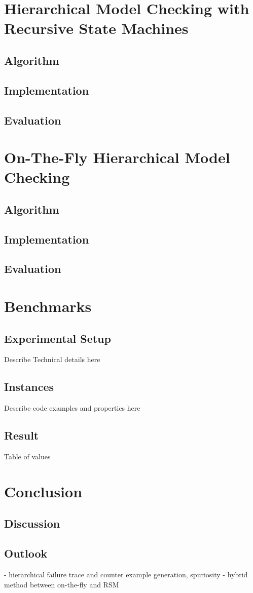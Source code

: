 \documentclass[a4paper, 12pt, twoside]{report}
\begin{document}
	\chapter{Hierarchical Model Checking with Recursive State Machines}\label{chp:hmc}

	\section{Algorithm}
	\section{Implementation}
	\section{Evaluation}
	
	
	\chapter{On-The-Fly Hierarchical Model Checking}\label{chp:otf}
	\section{Algorithm}
	\section{Implementation}
	\section{Evaluation}
	
	\chapter{Benchmarks}	
	\section{Experimental Setup}
	Describe Technical details here
	\section{Instances}
	Describe code examples and properties here
	\section{Result}
	Table of values
	
	\chapter{Conclusion}
	\section{Discussion}	
	\section{Outlook}
	
		- hierarchical failure trace and counter example generation, spuriosity
	- hybrid method between on-the-fly and RSM
	
	
	{}
	
\end{document}
